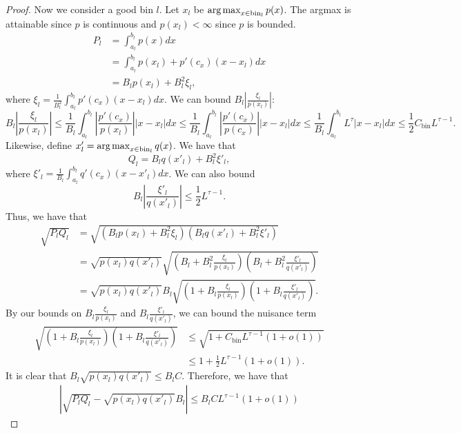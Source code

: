 \documentclass{article}
\newcommand{\bin}{\text{bin}}
\begin{document}
\begin{proof}
Now we consider a good bin $l$. Let $x_l$ be $\argmax_{x \in \bin_l} p(x)$. The argmax is attainable since $p$ is continuous and $p(x_l) < \infty$ since $p$ is bounded.
\begin{align*}
P_l &= \int_{a_l}^{b_l} p(x) dx \\
   &= \int_{a_l}^{b_l} p(x_l) + p'(c_x)(x-x_l) dx \\
   &= B_l p(x_l) + B_l^2 \xi_l,
\end{align*}
where $\xi_l = \frac{1}{B_l^2} \int_{a_l}^{b_l} p'(c_x)(x - x_l)dx$. We can bound $B_l \left| \frac{\xi_l}{p(x_l)} \right|$:
$$
B_l \left| \frac{\xi_l}{p(x_l)} \right| 
    \leq \frac{1}{B_l} \int_{a_l}^{b_l} \left|\frac{p'(c_x)}{p(x_l)} \right| |x - x_l| dx 
   \leq \frac{1}{B_l} \int_{a_l}^{b_l} \left|\frac{p'(c_x)}{p(c_x)} \right| |x - x_l| dx 
                \leq \frac{1}{B_l} \int_{a_l}^{b_l} L^{\tau} |x - x_l| dx \leq 
 \frac{1}{2} C_\bin L^{\tau - 1}. 
$$ 
Likewise, define $x'_l = \argmax_{x \in \bin_l} q(x)$. We have that
\[
Q_l = B_l q(x'_l) + B_l^2 \xi'_l,
\]
where $\xi'_l = \frac{1}{B_l} \int_{a_l}^{b_l} q'(c_x) (x - x'_l) dx$. We can also bound 
\[
B_l \left| \frac{\xi'_l}{q(x'_l)} \right| \leq \frac{1}{2}  L^{\tau - 1}.
\]
Thus, we have that
\begin{align*}
 \sqrt{P_l Q_l} &= \sqrt{ (B_l p(x_l) + B_l^2 \xi_l) 
                           (B_l q(x'_l) + B_l^2 \xi'_l) } \\
    &= \sqrt{p(x_l) q(x'_l)} \sqrt{ (B_l + B_l^2 \frac{\xi_l}{p(x_l)} ) 
                                           (B_l + B_l^2 \frac{\xi'_l}{q(x'_l)} ) } \\
   &=  \sqrt{p(x_l) q(x'_l)} B_l \sqrt{ (1 + B_l \frac{\xi_l}{p(x_l)} ) 
                                           (1 + B_l \frac{\xi'_l}{q(x'_l)} ) }.
\end{align*}
By our bounds on $ B_l \frac{\xi_l}{p(x_l)} $ and $B_l  \frac{\xi'_l}{q(x'_l)}$, we can bound the nuisance term 
\begin{align*}
 \sqrt{ (1 + B_l \frac{\xi_l}{p(x_l)} ) 
         (1 + B_l \frac{\xi'_l}{q(x'_l)} ) } &\leq \sqrt{ 1 + C_\bin L^{\tau - 1} (1+o(1))} \\
   &\leq 1 + \frac{1}{2}  L^{\tau - 1} (1 + o(1)).
\end{align*}
It is clear that $B_l \sqrt{p(x_l)q(x'_l)} \leq B_l C$. Therefore, we have that
\begin{align}
\label{eqn:discrete_riemann_bound2}
\left| \sqrt{ P_l Q_l} -  \sqrt{ p(x_l) q(x'_l)} B_l \right| \leq 
     B_l C  L^{\tau - 1}(1 + o(1))
\end{align}

\end{proof}
\end{document}
